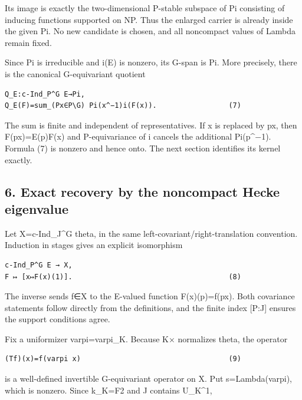 Its image is exactly the two-dimensional P-stable subspace of Pi
consisting of inducing functions supported on NP. Thus the enlarged
carrier is already inside the given Pi. No new candidate is chosen, and
all noncompact values of Lambda remain fixed.

Since Pi is irreducible and i(E) is nonzero, its G-span is Pi. More
precisely, there is the canonical G-equivariant quotient

\begin{Verbatim}[fontsize=\small,breaklines=true,breakanywhere=true]
Q_E:c-Ind_P^G E→Pi,
Q_E(F)=sum_(Px∈P\G) Pi(x^−1)i(F(x)).                 (7)
\end{Verbatim}

The sum is finite and independent of representatives. If x is replaced
by px, then F(px)=E(p)F(x) and P-equivariance of i cancels the
additional Pi(p\^{}−1). Formula (7) is nonzero and hence onto. The next
section identifies its kernel exactly.

\hypertarget{rank~2-exact-recovery-by-the-noncompact-hecke-eigenvalue}{%
\subsection{6. Exact recovery by the noncompact Hecke
eigenvalue}\label{rank~2-exact-recovery-by-the-noncompact-hecke-eigenvalue}}

Let X=c-Ind\_J\^{}G theta, in the same left-covariant/right-translation
convention. Induction in stages gives an explicit isomorphism

\begin{Verbatim}[fontsize=\small,breaklines=true,breakanywhere=true]
c-Ind_P^G E → X,
F ↦ [x↦F(x)(1)].                                     (8)
\end{Verbatim}

The inverse sends f∈X to the E-valued function F(x)(p)=f(px). Both
covariance statements follow directly from the definitions, and the
finite index {[}P:J{]} ensures the support conditions agree.

Fix a uniformizer varpi=varpi\_K. Because K× normalizes theta, the
operator

\begin{Verbatim}[fontsize=\small,breaklines=true,breakanywhere=true]
(Tf)(x)=f(varpi x)                                   (9)
\end{Verbatim}

is a well-defined invertible G-equivariant operator on X. Put
s=Lambda(varpi), which is nonzero. Since k\_K=F2 and J contains
U\_K\^{}1,

